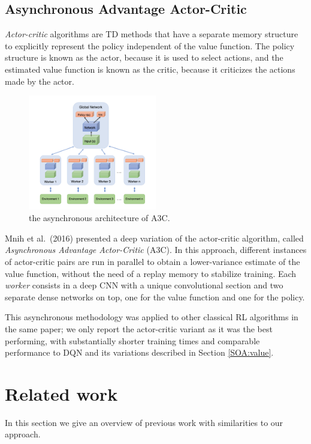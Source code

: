 \subsection{Asynchronous Advantage Actor-Critic}
\textit{Actor-critic} algorithms \cite{sutton1998reinforcement} are TD methods 
that have a separate memory structure to explicitly represent the policy 
independent of the value function. The policy structure is known as the actor, 
because it is used to select actions, and the estimated value function is known 
as the critic, because it criticizes the actions made by the actor.
%
\begin{figure}[h]
\includegraphics[width=0.5\textwidth]{pictures/a3c}
\centering
\caption{the asynchronous architecture of A3C.}
\end{figure}
%
Mnih et al.\ (2016) \cite{mnih2016asynchronous} presented a deep variation of 
the actor-critic algorithm, called \textit{Asynchronous Advantage Actor-Critic} 
(A3C). In this approach, different instances of actor-critic pairs are run in 
parallel to obtain a lower-variance estimate of the value function, without the 
need of a replay memory to stabilize training. Each \textit{worker} consists in 
a deep CNN with a unique convolutional section and two separate dense networks
on top, one for the value function and one for the policy. 

This asynchronous methodology was applied to other classical RL algorithms in 
the same paper; we only report the actor-critic variant as it was the best 
performing, with substantially shorter training times and comparable performance
to DQN and its variations described in Section \ref{SOA:value}.

\section{Related work}
In this section we give an overview of previous work with similarities to our
approach.

